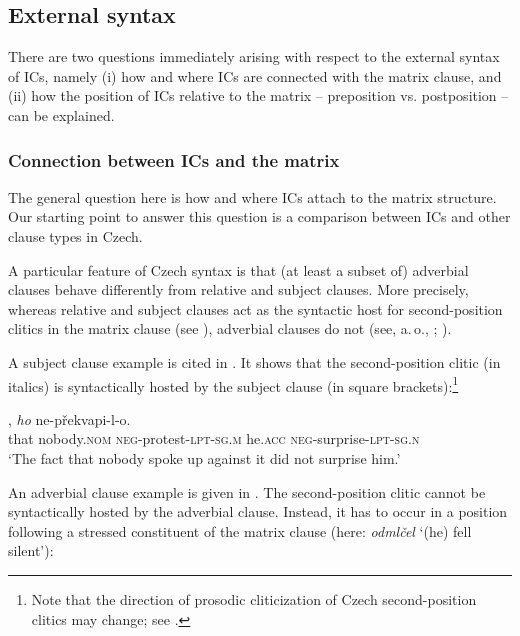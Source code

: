 \documentclass[output=paper,colorlinks,citecolor=brown,
modfonts,newtxmath
]{langscibook}
\begin{document}

\subsection{External syntax}\label{sec:syntax_external}

There are two questions immediately arising with respect to the external syntax of ICs, namely (i) how and where ICs are connected with the matrix clause, and (ii) how the position of ICs relative to the matrix -- preposition vs. postposition -- can be explained.

\subsubsection{Connection between ICs and the matrix}\label{sec:syntax_external_connection}

The general question here is how and where ICs attach to the matrix structure. Our starting point to answer this question is a comparison between ICs and other clause types in Czech.

A particular feature of Czech syntax is that (at least a subset of) adverbial clauses behave differently from relative and subject clauses. More precisely, whereas relative and subject clauses act as the syntactic host for second-position clitics in the matrix clause (see \citealt{Dokulil1956,Fried1994}), adverbial clauses do not (see, a.\,o., \citealt[109]{Dokulil1956}; \citealt[150]{Lenertova2004}). 

A subject clause example is cited in . It shows that the second-position clitic (in italics) is syntactically hosted by the subject clause (in square brackets):\footnote{Note that the direction of prosodic cliticization of Czech second-position clitics may change; see \citet{Toman1996}.}

\ea\label{ex:Subjektsatz}
, \textit{ho} ne-překvapi-l-o.\\
	{} that nobody.\textsc{nom} \textsc{neg}-protest-\textsc{lpt-sg.m} he.\textsc{acc} \textsc{neg}-surprise-\textsc{lpt-sg.n}\\
\glt `The fact that nobody spoke up against it did not surprise him.' \\ \hfill \citep[Czech;][168]{Fried1994}
\z

\noindent An adverbial clause example is given in . The second-position clitic cannot be syntactically hosted by the adverbial clause. Instead, it has to occur in a position following a stressed constituent of the matrix clause (here: \textit{odmlčel} `(he) fell silent'):
\end{document}
